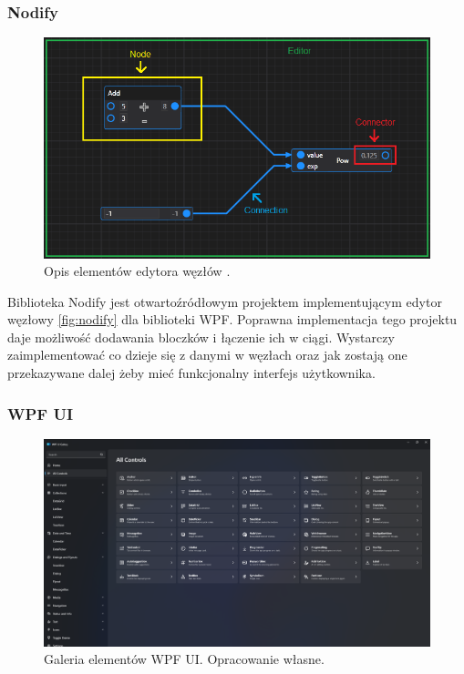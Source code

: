 \subsubsection{Nodify}
\begin{figure}[H]
    \centering
    \includegraphics[width=0.8\linewidth]{./images/Picture7.png}
    \caption{Opis elementów edytora węzłów \cite{node}.}
    \label{fig:nodify}
\end{figure}

Biblioteka Nodify \cite{nodify} jest otwartoźródłowym projektem implementującym edytor węzłowy \autoref{fig:nodify} dla biblioteki WPF. 
Poprawna implementacja tego projektu daje możliwość dodawania bloczków i łączenie ich w ciągi. 
Wystarczy zaimplementować co dzieje się z danymi w węzłach oraz jak zostają one przekazywane dalej żeby mieć funkcjonalny interfejs użytkownika. 

\subsubsection{WPF UI}
\begin{figure}[H]
    \centering
    \includegraphics[width=0.9\linewidth]{./images/Picture8.png}
    \caption{Galeria elementów WPF UI. Opracowanie własne.}
    \label{fig:wpfui}
\end{figure}

